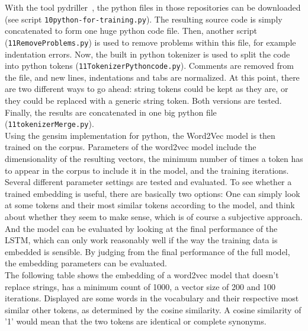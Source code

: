 \documentclass[
	a4paper,
	pagesize,
	pdftex,
	12pt,
	twoside, %
	BCOR=5mm, %
	ngerman,
	fleqn,
	final,
	]{scrartcl}
\begin{document}
\normalsize
With the tool pydriller~\cite{Spadini.2018}, the python files in those repositories can be downloaded (see script \texttt{10python-for-training.py}). The resulting source code is simply concatenated to form one huge python code file. Then, another script (\texttt{11RemoveProblems.py}) is used to remove problems within this file, for example indentation errors. Now, the built in python tokenizer is used to split the code into python tokens (\texttt{11TokenizerPythoncode.py}). Comments are removed from the file, and new lines, indentations and tabs are normalized. At this point, there are two different ways to go ahead: string tokens could be kept as they are, or they could be replaced with a generic string token. Both versions are tested. Finally, the results are concatenated in one big python file (\texttt{11tokenizerMerge.py}).\\
Using the gensim implementation for python, the Word2Vec model is then trained on the corpus. Parameters of the word2vec model include the dimensionality of the resulting vectors, the minimum number of times a token has to appear in the corpus to include it in the model, and the training iterations. Several different parameter settings are tested and evaluated. To see whether a trained embedding is useful, there are basically two options: One can simply look at some tokens and their most similar tokens according to the model, and think about whether they seem to make sense, which is of course a subjective approach. And the model can be evaluated by looking at the final performance of the LSTM, which can only work reasonably well if the way the training data is embedded is sensible. By judging from the final performance of the full model, the embedding parameters can be evaluated.\\
The following table shows the embedding of a word2vec model that doesn't replace strings, has a minimum count of 1000, a vector size of 200 and 100 iterations. Displayed are some words in the vocabulary and their respective most similar other tokens, as determined by the cosine similarity. A cosine similarity of '1' would mean that the two tokens are identical or complete synonyms.
\end{document}
